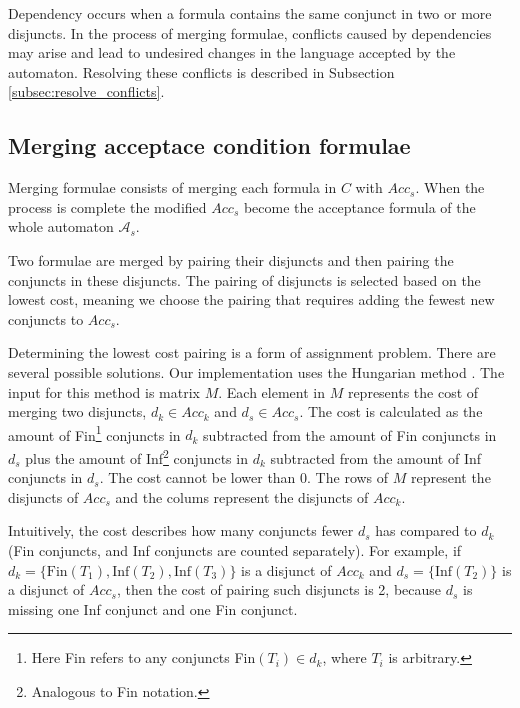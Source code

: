 \documentclass[
  digital, %
  twoside, %
  table,   %
  lof,     %
  lot,     %
]{fithesis3}
\begin{document}
Dependency occurs when a formula contains the same conjunct in two or more disjuncts. In the process of merging formulae, conflicts caused by dependencies may arise and lead to undesired changes in the language accepted by the automaton. Resolving these conflicts is described in Subsection \ref{subsec:resolve_conflicts}. 

\subsection{Merging acceptace condition formulae}
Merging formulae consists of merging each formula in $C$ with $Acc_s$. When the process is complete the modified $Acc_s$ become the acceptance formula of the whole automaton $\mathcal{A}_s$.

Two formulae are merged by pairing their disjuncts and then pairing the conjuncts in these disjuncts. The pairing of disjuncts is selected based on the lowest cost, meaning we choose the pairing that requires adding the fewest new conjuncts to $Acc_s$. 

Determining the lowest cost pairing is a form of assignment problem. There are several possible solutions. Our implementation uses the Hungarian method \cite{hungarian_method}. The input for this method is matrix $M$. Each element in $M$ represents the cost of merging two disjuncts, $d_k \in Acc_k$ and $d_s \in Acc_s$. The cost is calculated as the amount of Fin\footnote{Here Fin refers to any conjuncts Fin$(T_i) \in d_k$, where $T_i$ is arbitrary.} conjuncts in $d_k$ subtracted from the amount of Fin conjuncts in $d_s$ plus the amount of Inf\footnote{Analogous to Fin notation.} conjuncts in $d_k$ subtracted from the amount of Inf conjuncts in $d_s$. The cost cannot be lower than 0. The rows of $M$ represent the disjuncts of $Acc_s$ and the colums represent the disjuncts of $Acc_k$.

Intuitively, the cost describes how many conjuncts fewer $d_s$ has compared to $d_k$ (Fin conjuncts, and Inf conjuncts are counted separately). For example, if $d_k = \{\text{Fin}(T_1), \text{Inf}(T_2), \text{Inf}(T_3)\}$ is a disjunct of $Acc_k$ and $d_s = \{\text{Inf}(T_2)\}$ is a disjunct of $Acc_s$, then the cost of pairing such disjuncts is 2, because $d_s$ is missing one Inf conjunct and one Fin conjunct. 
\end{document}
